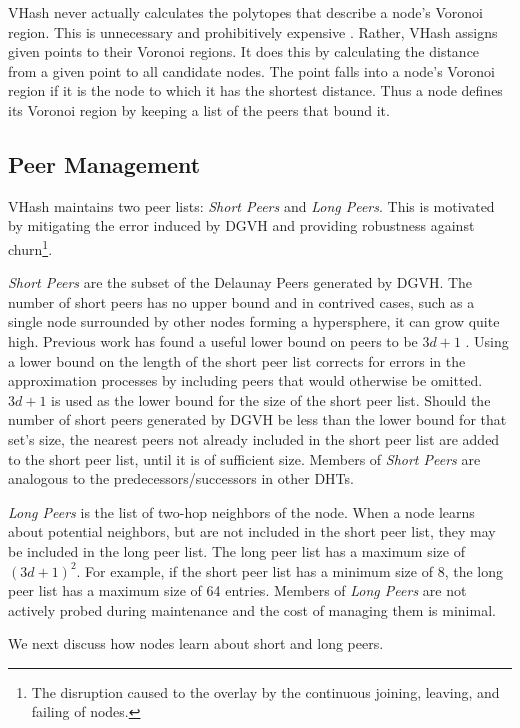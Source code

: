 \documentclass[10pt, conference, letterpaper]{IEEEtran}
\begin{document}
VHash never actually calculates the polytopes that describe a node's Voronoi region.
This is unnecessary and prohibitively expensive \cite{raynet}.
Rather, VHash assigns given points to their Voronoi regions.
It does this by calculating the distance from a given point to all candidate nodes.
The point falls into a node's Voronoi region if it is the node to which it has the shortest distance.
Thus a node defines its Voronoi region by keeping a list of the peers that bound it.

\subsection{Peer Management}
VHash maintains two peer lists: \textit{Short Peers} and \textit{Long Peers}.
This is motivated by mitigating the error induced by DGVH and providing robustness against churn\footnote{The disruption caused to the overlay by the continuous joining, leaving, and failing of nodes.}.

\textit{Short Peers} are the subset of the Delaunay Peers generated by DGVH. 
The number of short peers has no upper bound and in contrived cases, such as a single node surrounded by other nodes forming a hypersphere, it can grow quite high.
Previous work has found a useful lower bound on peers to be $3d + 1$ \cite{raynet}.
Using a lower bound on the length of the short peer list corrects for errors in the approximation processes by including peers that would otherwise be omitted. 
$3d+1$ is used as the lower bound for the size of the short peer list.
Should the number of short peers generated by DGVH be less than the lower bound for that set's size, the nearest peers not already included in the short peer list are added to the short peer list, until it is of sufficient size.
Members of \textit{Short Peers} are analogous to the predecessors/successors in other DHTs.

\textit{Long Peers} is the list of two-hop neighbors of the node.
When a node learns about potential neighbors, but are not included in the short peer list, they may be included in the long peer list.  
The long peer list has a maximum size of $(3d+1)^2$.  
For example, if the short peer list has a minimum size of 8, the long peer list has a maximum size of 64 entries.  
Members of \textit{Long Peers} are not actively probed during maintenance and the cost of managing them is minimal.

We next discuss how nodes learn about short and long peers.
\end{document}

